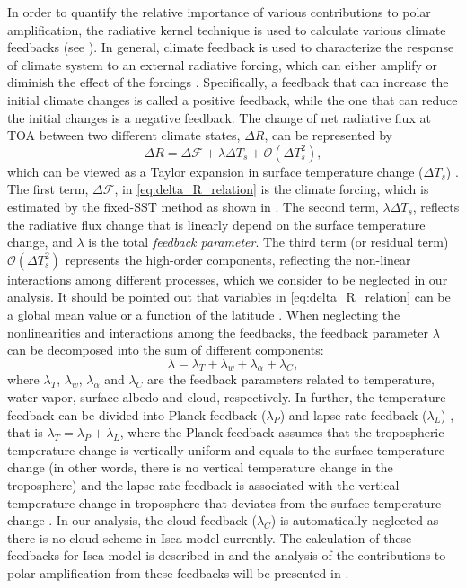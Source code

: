 In order to quantify the relative importance of various contributions to polar amplification, the radiative kernel technique \citep{Soden2008,Shell2008} is used to calculate various climate feedbacks (see ). In general, climate feedback is used to characterize the response of climate system to an external radiative forcing, which can either amplify or diminish the effect of the forcings \citep{Hansen1984}. Specifically, a feedback that can increase the initial climate changes is called a positive feedback, while the one that can reduce the initial changes is a negative feedback. The change of net radiative flux at TOA between two different climate states, $\Delta R$, can be represented by
\begin{equation}
\Delta R = \Delta \mathscr{F}+\lambda \Delta T_s + \mathcal{O}\left( \Delta T_s^2 \right),
\label{eq:delta_R_relation}
\end{equation}
which can be viewed as a Taylor expansion in surface temperature change ($\Delta T_s$) \citep{Feldl2013a}. The first term, $\Delta \mathscr{F}$, in \eqref{eq:delta_R_relation} is the climate forcing, which is estimated by the fixed-SST method \citep{Hansen2005, Feldl2013a, Kim2018} as shown in . The second term,  $\lambda \Delta T_s$, reflects the radiative flux change that is linearly depend on the surface temperature change, and $\lambda$ is the total \textit{feedback parameter}. The third term (or residual term) $ \mathcal{O}\left( \Delta T_s^2 \right)$ represents the high-order components, reflecting the non-linear interactions among different processes, which we consider to be neglected in our analysis. It should be pointed out that variables in \eqref{eq:delta_R_relation} can be a global mean value or a function of the latitude \citep{Feldl2013a}. When neglecting the nonlinearities and interactions among the feedbacks, the feedback parameter $\lambda$ can be decomposed into the sum of different components:
\begin{equation}
\lambda=\lambda_T+\lambda_{w} +\lambda_\alpha+\lambda_C,
\label{eq:fb_decmop}
\end{equation}
where $\lambda_T$, $\lambda_{w}$, $\lambda_\alpha$ and $\lambda_C$ are the feedback parameters related to temperature, water vapor, surface albedo and cloud, respectively. In further, the temperature feedback can be divided into Planck  feedback ($\lambda_P$) and lapse rate  feedback ($\lambda_L$) \citep{Soden2006}, that is $\lambda_T=\lambda_P+\lambda_L$, where the Planck feedback assumes that the tropospheric temperature change is vertically uniform and equals to the surface temperature change (in other words, there is no vertical temperature change in the troposphere) and the lapse rate feedback is associated with the vertical temperature change in troposphere that deviates from the surface temperature change \citep{Bony2006,Soden2006,Feldl2017}. In our analysis, the cloud feedback ($\lambda_C$) is automatically neglected as there is no cloud scheme in Isca model currently. The calculation of these feedbacks for Isca model is described in  and the analysis of the contributions to polar amplification from these feedbacks will be presented in .


